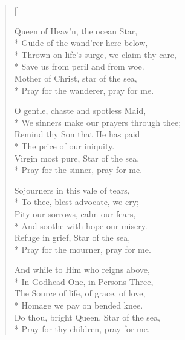 \newHymn



\begin{verse}[\versewidth]

\begin{patverse}
 Queen of Heav'n, the ocean Star,\\*
    Guide of the wand'rer here below,\\*
        Thrown on life's
surge, we claim thy care,\\*
    Save us from peril
    and from woe.\\
        Mother of
Christ, star
of the sea,\\*
    Pray for
    the
    wanderer,
    pray for me.
\end{patverse}

\begin{patverse}
O gentle, chaste and spotless Maid,\\*
    We sinners make our prayers through thee;\\
Remind thy Son that He has paid\\*
    The price of our iniquity.\\
        Virgin most pure, Star of the sea,\\*
    Pray for the sinner, pray for me.
\end{patverse}

\begin{patverse}
Sojourners in this vale of tears,\\*
    To thee, blest advocate, we cry;\\
        Pity our sorrows, calm our fears,\\*
    And soothe with hope our misery.\\
        Refuge in grief, Star of the sea,\\*
    Pray for the mourner, pray for me.
\end{patverse}

\begin{patverse}
And while to Him who reigns above,\\*
    In Godhead One, in Persons Three,\\
        The Source of life, of
grace, of love,\\*
    Homage we pay on
    bended knee.\\
        Do thou,
bright Queen,
Star of the sea,\\*
    Pray for
    thy
    children,
    pray for me.
\end{patverse}
    
\end{verse}

    